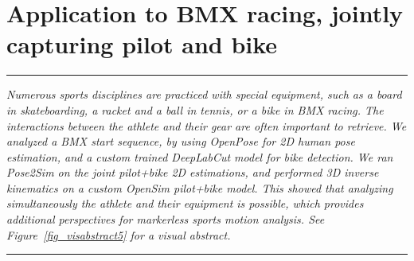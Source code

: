 
\lhead[\fancyplain{}{\leftmark}]%
      {\fancyplain{}{}} %
\chead[\fancyplain{}{}]%
      {\fancyplain{}{}}
\rhead[\fancyplain{}{}]%
      {\fancyplain{}{\rightmark}}%
\lfoot[\fancyplain{}{}]%
      {\fancyplain{}{}}
\cfoot[\fancyplain{}{\thepage}]%
      {\fancyplain{}{\thepage}} %
\rfoot[\fancyplain{}{}]%
     {\fancyplain{}{\scriptsize}}



\chapter{Application to BMX racing, jointly capturing pilot and bike}
\label{ch:7}


\begin{center}
\rule{0.7\linewidth}{.5pt}
\begin{minipage}{0.7\linewidth}
\smallskip

\textit{Numerous sports disciplines are practiced with special equipment, such as a board in skateboarding, a racket and a ball in tennis, or a bike in BMX racing. The interactions between the athlete and their gear are often important to retrieve. We analyzed a BMX start sequence, by using OpenPose for 2D human pose estimation, and a custom trained DeepLabCut model for bike detection. We ran Pose2Sim on the joint {pilot+bike} 2D estimations, and performed 3D inverse kinematics on a custom OpenSim {pilot+bike} model. This showed that analyzing simultaneously the athlete and their equipment is possible, which provides additional perspectives for markerless sports motion analysis.\newline
See Figure~\ref{fig_visabstract5} for a visual abstract.
}

\end{minipage}
\smallskip
\rule{0.7\linewidth}{.5pt}
\end{center}

